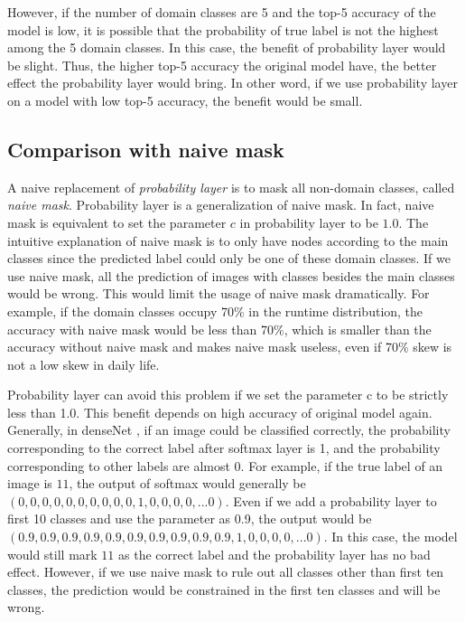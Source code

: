 \documentclass[conference]{IEEEtran}
\begin{document}
\begin{spacing}{0.9}
However, if the number of domain classes are 5 and the top-5 accuracy of the model is low, it is possible that the probability of true label is not the highest among the 5 domain classes. In this case, the benefit of probability layer would be slight. Thus, the higher top-5 accuracy the original model have, the better effect the probability layer would bring. In other word, if we use probability layer on a model with low top-5 accuracy, the benefit would be small. 





\subsection{Comparison with naive mask}
A naive replacement of \textit{probability layer} is to mask all non-domain classes, called \textit{naive mask}. Probability layer is a generalization of naive mask. In fact, naive mask is equivalent to set the parameter $c$ in probability layer to be $1.0$. The intuitive explanation of naive mask is to only have nodes according to the main classes since the predicted label could only be one of these domain classes. If we use naive mask, all the prediction of images with classes besides the main classes would be wrong. This would limit the usage of naive mask dramatically. For example, if the domain classes occupy 70\% in the runtime distribution, the accuracy with naive mask would be less than 70\%, which is smaller than the accuracy without naive mask and makes naive mask useless, even if 70\% skew is not a low skew in daily life. 

Probability layer can avoid this problem if we set the parameter c to be strictly less than 1.0. This benefit depends on high accuracy of original model again. Generally, in denseNet \cite{huang2017densely}, if an image could be classified correctly, the probability corresponding to the correct label after softmax layer is 1, and the probability corresponding to other labels are almost 0. For example, if the true label of an image is $11$, the output of softmax would generally be $(0, 0, 0, 0, 0, 0, 0, 0, 0, 0, 1, 0, 0, 0, 0, ... 0)$. Even if we add a probability layer to first 10 classes and use the parameter as 0.9, the output would be $(0.9, 0.9, 0.9, 0.9, 0.9, 0.9, 0.9, 0.9, 0.9, 0.9, 1, 0, 0, 0, 0, ... 0)$. In this case, the model would still mark $11$ as the correct label and the probability layer has no bad effect. However, if we use naive mask to rule out all classes other than first ten classes, the prediction would be constrained in the first ten classes and will be wrong. 


\end{spacing}
\end{document}
